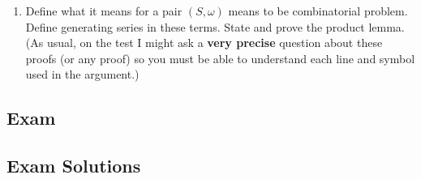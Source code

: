 \documentclass{report}
\begin{document}
{\begin{enumerate}
{              \begin{align*}
                  |A_2^c \cap A_4^c \cap A_6^c \cap A_8^c| = |S| - \sum |A_i| + \sum |A_i \cap A_j| - \sum |A_i \cap A_j \cap A_k| + |A_2 \cap A_4 \cap A_6 \cap A_8| \\
              \end{align*}

              Each sum can be calculated as follows:

              \begin{align*}
                  \sum |A_{i_1} \cap A_{i_2} \cdots A_{i_k}| & = \binom{4}{k}(8-k)! \\
              \end{align*}

              This is because there are $4$ ways to choose the even numbers that are fixed.
              For each of these choices, there are $8-k$ ways to choose the remaining numbers. \\

              So, we have:

              \begin{align*}
                  8! - \binom{4}{1}7! + \binom{4}{2} 6! - \binom{4}{3} 5! + \binom{4}{4} 4!
              \end{align*}
          }

    \item Define what it means for a pair $(S, \omega)$ means to be combinatorial
          problem. Define generating series in these terms. State and prove the
          product lemma. (As usual, on the test I might ask a \textbf{very precise}
          question about these proofs (or any proof) so you must be able to
          understand each line and symbol used in the argument.)
\end{enumerate}

\subsection{Exam}

\subsection{Exam Solutions}

}
\end{document}
